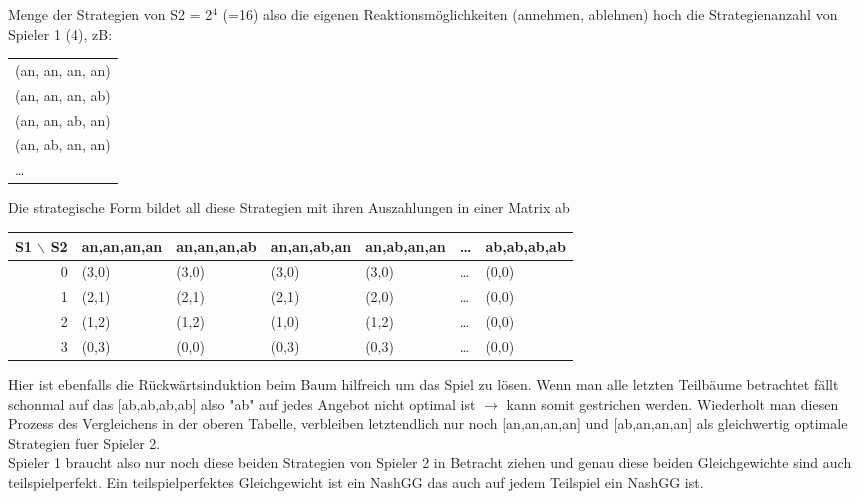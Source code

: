 \documentclass[11pt]{article}
\begin{document}
Menge der Strategien von S2 = 2\(^{\text{4}}\) (=16) also die eigenen Reaktionsmöglichkeiten (annehmen, ablehnen) hoch die Strategienanzahl von Spieler 1 (4), zB:
\begin{center}
\begin{tabular}{l}
(an, an, an, an)\\
(an, an, an, ab)\\
(an, an, ab, an)\\
(an, ab, an, an)\\
\ldots{}\\
\end{tabular}
\end{center}
Die strategische Form bildet all diese Strategien mit ihren Auszahlungen in einer Matrix ab
\begin{center}
\begin{tabular}{rllllll}
S1 $\backslash$ S2 & an,an,an,an & an,an,an,ab & an,an,ab,an & an,ab,an,an & \ldots{} & ab,ab,ab,ab\\
\hline
0 & (3,0) & (3,0) & (3,0) & (3,0) & \ldots{} & (0,0)\\
1 & (2,1) & (2,1) & (2,1) & (2,0) & \ldots{} & (0,0)\\
2 & (1,2) & (1,2) & (1,0) & (1,2) & \ldots{} & (0,0)\\
3 & (0,3) & (0,0) & (0,3) & (0,3) & \ldots{} & (0,0)\\
\end{tabular}
\end{center}
Hier ist ebenfalls die Rückwärtsinduktion beim Baum hilfreich um das Spiel zu lösen. Wenn man alle letzten Teilbäume betrachtet fällt schonmal auf das [ab,ab,ab,ab] also "ab" auf jedes Angebot nicht optimal ist \(\rightarrow\) kann somit gestrichen werden. Wiederholt man diesen Prozess des Vergleichens in der oberen Tabelle, verbleiben letztendlich nur noch [an,an,an,an] und [ab,an,an,an] als gleichwertig optimale Strategien fuer Spieler 2.\\
Spieler 1 braucht also nur noch diese beiden Strategien von Spieler 2 in Betracht ziehen und genau diese beiden Gleichgewichte sind auch teilspielperfekt. Ein teilspielperfektes Gleichgewicht ist ein NashGG das auch auf jedem Teilspiel ein NashGG ist.
\end{document}
